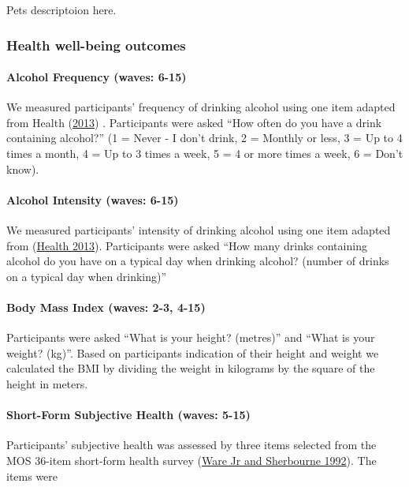 \documentclass[
  singlecolumn,
  9pt]{article}
\let\oldparagraph\paragraph
\renewcommand{\paragraph}[1]{\oldparagraph{#1}\mbox{}}
\begin{document}
Pets descriptoion here.

\subsubsection{Health well-being
outcomes}\label{health-well-being-outcomes}

\paragraph{Alcohol Frequency (waves:
6-15)}\label{alcohol-frequency-waves-6-15}

We measured participants' frequency of drinking alcohol using one item
adapted from Health (\hyperref[ref-Ministry_of_Health_2013]{2013}) .
Participants were asked ``How often do you have a drink containing
alcohol?'' (1 = Never - I don't drink, 2 = Monthly or less, 3 = Up to 4
times a month, 4 = Up to 3 times a week, 5 = 4 or more times a week, 6 =
Don't know).

\paragraph{Alcohol Intensity (waves:
6-15)}\label{alcohol-intensity-waves-6-15}

We measured participants' intensity of drinking alcohol using one item
adapted from (\hyperref[ref-Ministry_of_Health_2013]{Health 2013}).
Participants were asked ``How many drinks containing alcohol do you have
on a typical day when drinking alcohol? (number of drinks on a typical
day when drinking)''

\paragraph{Body Mass Index (waves: 2-3,
4-15)}\label{body-mass-index-waves-2-3-4-15}

Participants were asked ``What is your height? (metres)'' and ``What is
your weight? (kg)''. Based on participants indication of their height
and weight we calculated the BMI by dividing the weight in kilograms by
the square of the height in meters.

\paragraph{Short-Form Subjective Health (waves:
5-15)}\label{short-form-subjective-health-waves-5-15}

Participants' subjective health was assessed by three items selected
from the MOS 36-item short-form health survey
(\hyperref[ref-warejr1992]{Ware Jr and Sherbourne 1992}). The items were
\end{document}
